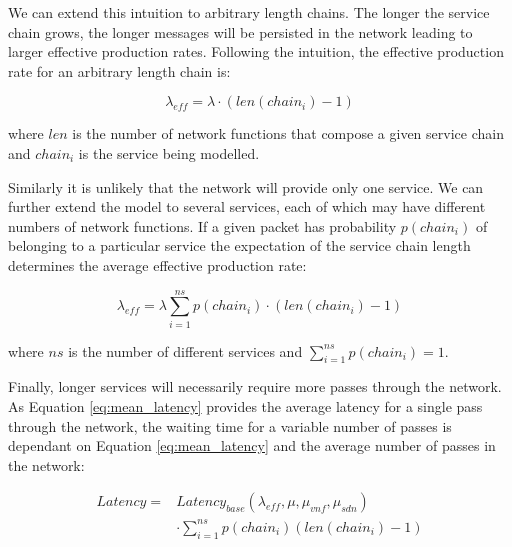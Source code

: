 We can extend this intuition to arbitrary length chains. The longer the service chain grows, the longer messages will be persisted in the network leading to larger effective production rates. Following the intuition, the effective production rate for an arbitrary length chain is:

\begin{equation}
\lambda_{eff} = \lambda \cdot (len(chain_i) - 1)
\end{equation}

where $len$ is the number of network functions that compose a given service chain and $chain_i$ is the service being modelled.

Similarly it is unlikely that the network will provide only one service. We can further extend the model to several services, each of which may have different numbers of network functions. If a given packet has probability $p(chain_i)$ of belonging to a particular service the expectation of the service chain length determines the average effective production rate:

\begin{equation}
\lambda_{eff} = \lambda \sum_{i=1}^{ns} p(chain_i) \cdot (len(chain_i) - 1)
\end{equation}

where $ns$ is the number of different services and $\sum_{i=1}^{ns} p(chain_i) = 1$.

Finally, longer services will necessarily require more passes through the network. As Equation \ref{eq:mean_latency} provides the average latency for a single pass through the network, the waiting time for a variable number of passes is dependant on Equation \ref{eq:mean_latency}  and the average number of passes in the network:

\begin{equation}
\label{eq:latency_eff}
\begin{split}
Latency = & Latency_{base}(\lambda_{eff}, \mu, \mu_{vnf}, \mu_{sdn}) \\
			  &\cdot \sum_{i=1}^{ns} p(chain_i) (len(chain_i) - 1)
\end{split}
\end{equation}

\vspace{0mm} %